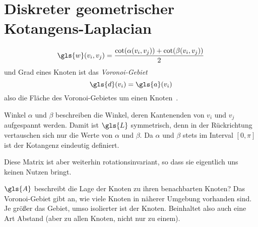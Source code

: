 \section{Diskreter geometrischer Kotangens-Laplacian}

\begin{equation}
  \gls{w}\left(v_i, v_j\right) = \frac{\cot\left(\alpha\left(v_i, v_j\right)\right) + \cot\left(\beta\left(v_i, v_j\right)\right)}{2}
\end{equation}
und Grad eines Knoten ist das \emph{Voronoi-Gebiet}
\begin{equation}
  \gls{d}\left(v_i\right) = \gls{a}\left(v_i\right)
\end{equation}
also die Fläche des Voronoi-Gebietes um einen Knoten~\cite{Reuter}.

Winkel $\alpha$ und $\beta$ beschreiben die Winkel, deren Kantenenden von $v_i$ und $v_j$ aufgespannt werden.
Damit ist $\gls{L}$ symmetrisch, denn in der Rückrichtung vertauschen sich nur die Werte von $\alpha$ und $\beta$.
Da $\alpha$ und $\beta$ stets im Interval $\left[0, \pi\right]$ ist der Kotangenz eindeutig definiert.

Diese Matrix ist aber weiterhin rotationsinvariant, so dass sie eigentlich uns keinen Nutzen bringt.

$\gls{A}$ beschreibt die Lage der Knoten zu ihren benachbarten Knoten? 
Das Voronoi-Gebiet gibt an, wie viele Knoten in näherer Umgebung vorhanden sind.
Je größer das Gebiet, umso isolierter ist der Knoten.
Beinhaltet also auch eine Art Abstand (aber zu allen Knoten, nicht nur zu einem).
